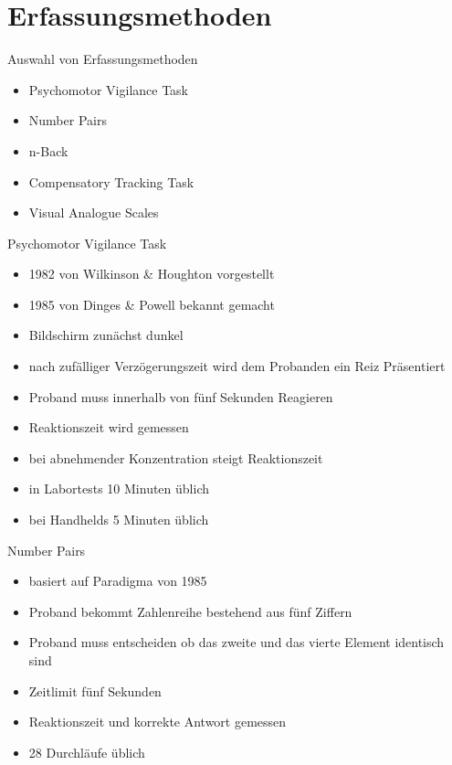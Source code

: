 \section{Erfassungsmethoden}

\begin{frame}{Auswahl von Erfassungsmethoden}
	\begin{itemize}[<+->]
	\item Psychomotor Vigilance Task
	\item Number Pairs
	\item n-Back
	\item Compensatory Tracking Task
	\item Visual Analogue Scales
	\end{itemize}
\end{frame}
\begin{frame}{Psychomotor Vigilance Task}
	\begin{itemize}[<+->]
	\item 1982 von Wilkinson \& Houghton vorgestellt
	\item 1985 von Dinges \& Powell bekannt gemacht
	\item Bildschirm zunächst dunkel
	\item nach zufälliger Verzögerungszeit wird dem Probanden ein Reiz Präsentiert
	\item Proband muss innerhalb von fünf Sekunden Reagieren
	\item Reaktionszeit wird gemessen
	\item bei abnehmender Konzentration steigt Reaktionszeit
	\item in Labortests 10 Minuten üblich
	\item bei Handhelds 5 Minuten üblich
	\end{itemize}
\end{frame}
\begin{frame}{Number Pairs}
	\begin{itemize}[<+->]
	\item basiert auf Paradigma von 1985
	\item Proband bekommt Zahlenreihe bestehend aus fünf Ziffern
	\item Proband muss entscheiden ob das zweite und das vierte Element identisch sind
	\item Zeitlimit fünf Sekunden
	\item Reaktionszeit und korrekte Antwort gemessen
	\item 28 Durchläufe üblich
	\end{itemize}
\end{frame}
